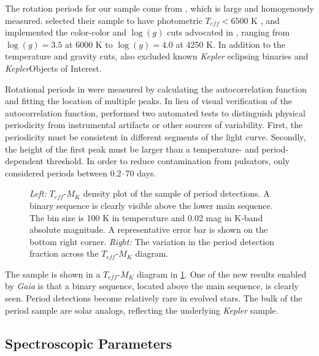 \documentclass[manuscript]{aastex6}
\newcommand{\Kepler}{\mbox{\textit{Kepler}}}
\newcommand{\Gaia}{\mbox{\textit{Gaia}}}
\newcommand{\Teff}{\ensuremath{T_{eff}}}
\newcommand{\logg}{\ensuremath{\log(g)}}
\begin{document}
The rotation periods for our sample come from \citet{McQuillan14}, which
is large and homogenously measured. \citet{McQuillan14} selected their sample 
to have photometric \(\Teff < 6500\) K \citep{Brown11,Dressing13}, and 
implemented the color-color and \logg{} cuts advocated in \citet{Ciardi11}, 
ranging from \(\logg = 3.5\) at 6000 K to \(\logg = 4.0\) at 4250 K. 
In addition to the temperature and gravity cuts, \citet{McQuillan14} also 
excluded known \Kepler{} eclipsing binaries and \Kepler Objects of Interest. 

Rotational periods in \citet{McQuillan14} were measured by calculating the 
autocorrelation function and fitting the location of multiple peaks. In lieu 
of visual verification of the autocorrelation function, \citet{McQuillan14}
performed two automated tests to distinguish physical periodicity from
instrumental artifacts or other sources of variability. First, the 
periodicity must be consistent in different segments of the light curve.
Secondly, the height of the first peak must be larger than a temperature- and
period-dependent threshold. In order to reduce contamination from pulsators, 
\citet{McQuillan14} only considered periods between 0.2--70 days.

\begin{figure}[htb]
    \centering
    \caption{\emph{Left:} \Teff-\(M_K\) density plot of the sample of
        \citet{McQuillan14} period detections. A binary sequence is clearly 
        visible above the lower main sequence. The bin size is 100 K in
        temperature and 0.02 mag in K-band absolute magnitude. A 
        representative error bar is shown on the bottom right corner. 
        \emph{Right:} The variation in the \citet{McQuillan14} period 
        detection fraction across the \Teff-\(M_K\) 
    diagram.}\label{fig:mcquillan_selection}
\end{figure}

The \citet{McQuillan14} sample is shown in a \Teff-\(M_K\)
diagram in \cref{fig:mcquillan_selection}. One of the new results enabled by 
\Gaia{} is that a binary sequence,
located above the main sequence, is clearly seen. Period detections become
relatively rare in evolved stars. The bulk of the period sample are solar
analogs, reflecting the underlying \Kepler{} sample.

\subsection{Spectroscopic Parameters}
\end{document}
